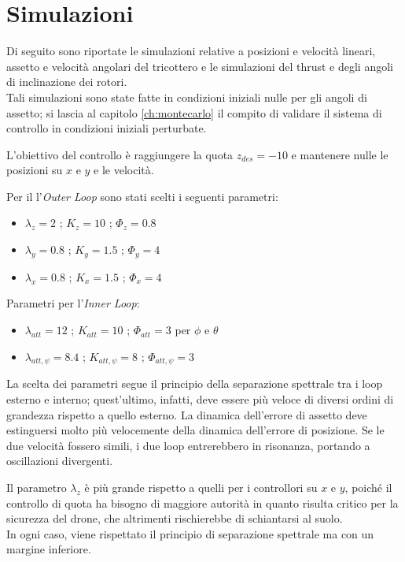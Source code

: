 \clearpage

\section{Simulazioni}
Di seguito sono riportate le simulazioni relative a posizioni e velocità lineari, assetto e velocità angolari del tricottero e le simulazioni del thrust e degli angoli di inclinazione dei rotori.
\\Tali simulazioni sono state fatte in condizioni iniziali nulle per gli angoli di assetto; si lascia al capitolo \ref{ch:montecarlo} il compito di validare il 
sistema di controllo in condizioni iniziali perturbate.

L'obiettivo del controllo è raggiungere la quota $z_{des} = -10$ e mantenere nulle le posizioni su $x$ e $y$ e le velocità.

Per il l'\textit{Outer Loop} sono stati scelti i seguenti parametri:
\begin{itemize}
    \item $\lambda_z = 2$ ;   $K_z = 10 $ ;     $\Phi_z = 0.8$
    \item $\lambda_y = 0.8$ ; $K_y = 1.5$ ;     $\Phi_y = 4$
    \item $\lambda_x = 0.8$ ; $K_x = 1.5$ ;     $\Phi_x = 4$
\end{itemize}

Parametri per l'\textit{Inner Loop}:
\begin{itemize}
    \item $\lambda_{att} = 12$ ;   $K_{att} = 10 $ ; $\Phi_{att} = 3$ per $\phi$ e $\theta$
    \item $\lambda_{att,\psi} = 8.4$ ;   $K_{att,\psi} = 8 $ ; $\Phi_{att,\psi} = 3$
\end{itemize}

La scelta dei parametri segue il principio della separazione spettrale tra i loop esterno e interno; quest'ultimo, infatti, deve essere
più veloce di diversi ordini di grandezza rispetto a quello esterno.
La dinamica dell'errore di assetto deve estinguersi molto più velocemente della dinamica dell'errore di posizione. Se le due velocità fossero simili, 
i due loop entrerebbero in risonanza, portando a oscillazioni divergenti.

Il parametro $\lambda_z$ è più grande rispetto a quelli per i controllori su $x$ e $y$, poiché il controllo 
di quota ha bisogno di maggiore autorità in quanto risulta critico per la sicurezza del drone, che altrimenti rischierebbe di schiantarsi al suolo.
\\In ogni caso, viene rispettato il principio di separazione spettrale ma con un margine inferiore.

